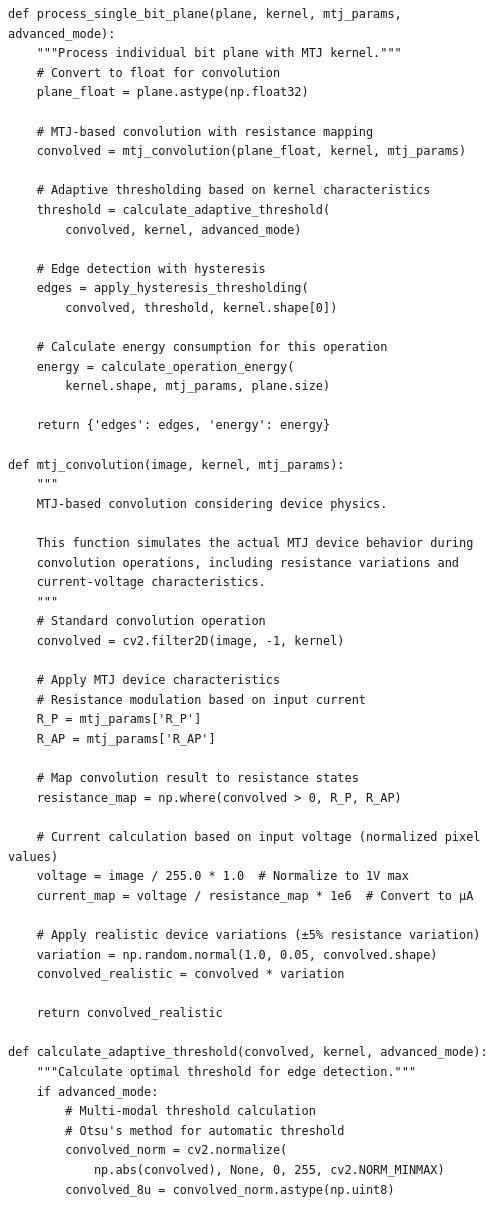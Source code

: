 \documentclass[conference]{IEEEtran}
\begin{document}
\begin{lstlisting}[caption={Complete MTJ edge detection pipeline implementation}]
def process_single_bit_plane(plane, kernel, mtj_params, advanced_mode):
    """Process individual bit plane with MTJ kernel."""
    # Convert to float for convolution
    plane_float = plane.astype(np.float32)
    
    # MTJ-based convolution with resistance mapping
    convolved = mtj_convolution(plane_float, kernel, mtj_params)
    
    # Adaptive thresholding based on kernel characteristics
    threshold = calculate_adaptive_threshold(
        convolved, kernel, advanced_mode)
    
    # Edge detection with hysteresis
    edges = apply_hysteresis_thresholding(
        convolved, threshold, kernel.shape[0])
    
    # Calculate energy consumption for this operation
    energy = calculate_operation_energy(
        kernel.shape, mtj_params, plane.size)
    
    return {'edges': edges, 'energy': energy}

def mtj_convolution(image, kernel, mtj_params):
    """
    MTJ-based convolution considering device physics.
    
    This function simulates the actual MTJ device behavior during 
    convolution operations, including resistance variations and 
    current-voltage characteristics.
    """
    # Standard convolution operation
    convolved = cv2.filter2D(image, -1, kernel)
    
    # Apply MTJ device characteristics
    # Resistance modulation based on input current
    R_P = mtj_params['R_P']
    R_AP = mtj_params['R_AP']
    
    # Map convolution result to resistance states
    resistance_map = np.where(convolved > 0, R_P, R_AP)
    
    # Current calculation based on input voltage (normalized pixel values)
    voltage = image / 255.0 * 1.0  # Normalize to 1V max
    current_map = voltage / resistance_map * 1e6  # Convert to µA
    
    # Apply realistic device variations (±5% resistance variation)
    variation = np.random.normal(1.0, 0.05, convolved.shape)
    convolved_realistic = convolved * variation
    
    return convolved_realistic

def calculate_adaptive_threshold(convolved, kernel, advanced_mode):
    """Calculate optimal threshold for edge detection."""
    if advanced_mode:
        # Multi-modal threshold calculation
        # Otsu's method for automatic threshold
        convolved_norm = cv2.normalize(
            np.abs(convolved), None, 0, 255, cv2.NORM_MINMAX)
        convolved_8u = convolved_norm.astype(np.uint8)
        

\end{lstlisting}
\end{document}
